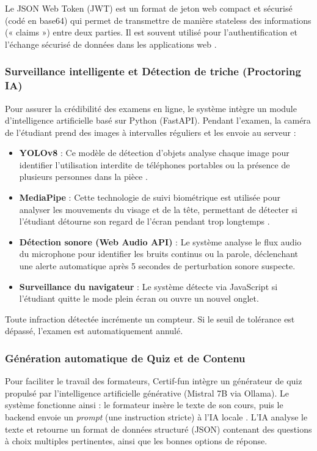 Le JSON Web Token (JWT) est un format de jeton web compact et sécurisé (codé en base64) qui permet de transmettre de manière stateless des informations (« claims ») entre deux parties. Il est souvent utilisé pour l’authentification et l’échange sécurisé de données dans les applications web \cite{mahindrakar2020jwt}.

\subsubsection{Surveillance intelligente et Détection de triche (Proctoring IA)}
Pour assurer la crédibilité des examens en ligne, le système intègre un module d'intelligence artificielle basé sur Python (FastAPI). Pendant l'examen, la caméra de l'étudiant prend des images à intervalles réguliers et les envoie au serveur :
\begin{itemize}
    \item \textbf{YOLOv8} : Ce modèle de détection d'objets analyse chaque image pour identifier l'utilisation interdite de téléphones portables ou la présence de plusieurs personnes dans la pièce \cite{sohan2025review}.
    \item \textbf{MediaPipe} : Cette technologie de suivi biométrique est utilisée pour analyser les mouvements du visage et de la tête, permettant de détecter si l'étudiant détourne son regard de l'écran pendant trop longtemps \cite{lugaresi2019mediapipe}.
    \item \textbf{Détection sonore (Web Audio API)} : Le système analyse le flux audio du microphone pour identifier les bruits continus ou la parole, déclenchant une alerte automatique après 5 secondes de perturbation sonore suspecte.
    \item \textbf{Surveillance du navigateur} : Le système détecte via JavaScript si l'étudiant quitte le mode plein écran ou ouvre un nouvel onglet.
\end{itemize}
Toute infraction détectée incrémente un compteur. Si le seuil de tolérance est dépassé, l'examen est automatiquement annulé.

\subsubsection{Génération automatique de Quiz et de Contenu}
Pour faciliter le travail des formateurs, Certif-fun intègre un générateur de quiz propulsé par l'intelligence artificielle générative (Mistral 7B via Ollama). Le système fonctionne ainsi : le formateur insère le texte de son cours, puis le backend envoie un \textit{prompt} (une instruction stricte) à l'IA locale \cite{novais2025using}. L'IA analyse le texte et retourne un format de données structuré (JSON) contenant des questions à choix multiples pertinentes, ainsi que les bonnes options de réponse.

